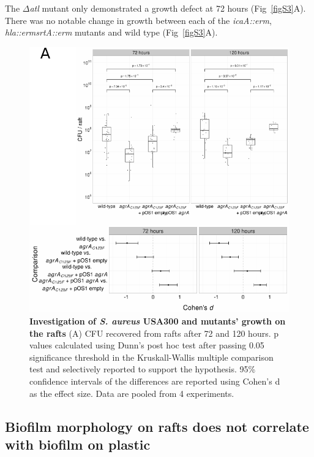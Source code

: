 \documentclass[10pt,letterpaper]{article}
\begin{document}
The $\Delta$\textit{atl} mutant only demonstrated a growth defect at 72 hours (Fig~\ref{figS3}A).
There was no notable change in growth between each of the \textit{icaA::erm}, \textit{hla::erm}\textit{srtA::erm} mutants and wild type (Fig~\ref{figS3}A).


\begin{figure}[!ht]
\begin{adjustwidth}{-2.25in}{0in}
\includegraphics[width=0.85\paperwidth]{Figures/fig3.pdf}
\caption[Investigation of \textit{S. aureus} USA300 and mutants' growth on the rafts]{
	\textbf{Investigation of \textit{S. aureus} USA300 and mutants' growth on the rafts}
	(A) CFU recovered from rafts after 72 and 120 hours. p values calculated using Dunn's post hoc test after passing 0.05 significance threshold in the Kruskall-Wallis multiple comparison test and selectively reported to support the hypothesis. 95\% confidence intervals of the differences are reported using Cohen's d as the effect size. Data are pooled from 4 experiments.}
	\label{fig3}
    \end{adjustwidth}
\end{figure}

\subsection*{Biofilm morphology on rafts does not correlate with biofilm on plastic}
\end{document}
